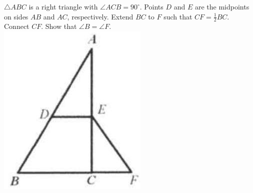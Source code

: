 \documentclass{article}
\begin{document}
\(\triangle A B C\) is a right triangle with \(\angle A C B=90^{\circ}\). Points \(D\) and \(E\) are the midpoints on sides \(A B\) and \(A C\), respectively. Extend \(B C\) to \(F\) such that \(C F=\frac{1}{2} B C\). Connect \(C F\). Show that \(\angle B=\angle F\).\\
\centering
\includegraphics[width=\textwidth]{images/011(2).jpg}
\end{document}

